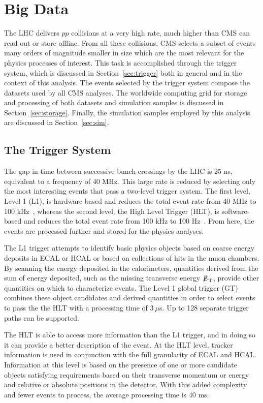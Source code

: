 \chapter{Big Data\label{ch:data}}

The LHC delivers $pp$ collisions at a very high rate, much higher than CMS can read out or store
offline. From all these collisions, CMS selects a subset of events many orders of magnitude smaller
in size
which are the most relevant for the physics processes of interest. This task is accomplished
through the trigger system, which is discussed in Section~\ref{sec:trigger} both in general and
in the context of this analysis. The events selected by the trigger system compose the datasets
used by all CMS analyses. The worldwide computing grid for storage and processing of both datasets
and simulation samples is discussed in Section~\ref{sec:storage}. Finally, the simulation samples
employed by this analysis are discussed in Section~\ref{sec:sim}.


\section{The Trigger System\label{sec:trigger}}

The gap in time between successive bunch crossings by the LHC is 25 ns, equivalent to
a frequency of 40 MHz. This large rate is reduced by selecting only the most interesting events
that pass a two-level trigger system. The first level, Level 1 (L1), is hardware-based and reduces the
total event rate from 40 MHz to 100 kHz~\cite{Bayatyan:706847}, whereas the second level,
the High Level Trigger (HLT), is software-based and reduces the total event rate from 100 kHz to
100 Hz~\cite{Virdee:1043242}. From here, the events are processed further and stored
for the physics analyses.

The L1 trigger attempts to identify basic physics objects based on coarse energy deposits in
ECAL or HCAL or
based on collections of hits in the muon chambers. By scanning the energy deposited in the calorimeters,
quantities derived from the sum of energy deposited, such as the missing transverse energy ${\not\mathrel{E}}_{\text{T}}$,
provide other quantities on which to characterize events.
The Level 1 global trigger (GT) combines these object candidates and derived quantities in order
to select events to pass the the HLT with a processing time of $3~\mu$s.
Up to 128 separate trigger paths can be supported.

The HLT is able to access more information than the L1 trigger, and in doing so it can provide
a better description of the event. At the HLT level, tracker information is used in conjunction with
the full granularity of ECAL and HCAL. Information at this level is based on the presence of one or
more candidate objects satisfying requirements based on their transverse momentum or energy and relative
or absolute positions in the detector. With this added complexity and fewer events to process,
the average processing time is 40 ms.

